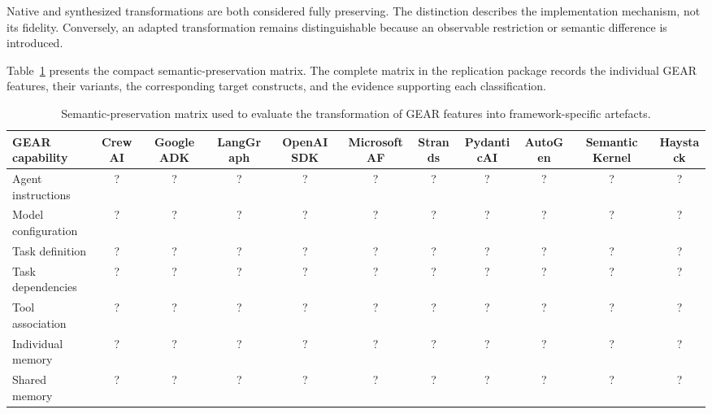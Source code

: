 Native and synthesized transformations are both considered fully preserving.
The distinction describes the implementation mechanism, not its fidelity.
Conversely, an adapted transformation remains distinguishable because an
observable restriction or semantic difference is introduced.

Table~\ref{tab:semantic-preservation-matrix} presents the compact
semantic-preservation matrix. The complete matrix in the replication package
records the individual GEAR features, their variants, the corresponding
target constructs, and the evidence supporting each classification.

\begin{table}[t]
    \centering
    \caption{Semantic-preservation matrix used to evaluate the transformation
    of GEAR features into framework-specific artefacts.}
    \label{tab:semantic-preservation-matrix}
    \scriptsize
    \setlength{\tabcolsep}{2pt}
    \renewcommand{\arraystretch}{1.08}
    \begin{tabularx}{\textwidth}{
        @{}
        >{\raggedright\arraybackslash}X
        cccccccccc
        @{}
    }
        \toprule
        \textbf{GEAR capability}
        & \textbf{CrewAI}
        & \textbf{Google ADK}
        & \textbf{LangGraph}
        & \textbf{OpenAI SDK}
        & \textbf{Microsoft AF}
        & \textbf{Strands}
        & \textbf{PydanticAI}
        & \textbf{AutoGen}
        & \textbf{Semantic Kernel}
        & \textbf{Haystack} \\
        \midrule

        Agent instructions
        & ? & ? & ? & ? & ? & ? & ? & ? & ? & ? \\

        Model configuration
        & ? & ? & ? & ? & ? & ? & ? & ? & ? & ? \\

        Task definition
        & ? & ? & ? & ? & ? & ? & ? & ? & ? & ? \\

        Task dependencies
        & ? & ? & ? & ? & ? & ? & ? & ? & ? & ? \\

        Tool association
        & ? & ? & ? & ? & ? & ? & ? & ? & ? & ? \\

        Individual memory
        & ? & ? & ? & ? & ? & ? & ? & ? & ? & ? \\

        Shared memory
        & ? & ? & ? & ? & ? & ? & ? & ? & ? & ? \\


\end{tabularx}
\end{table}
